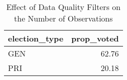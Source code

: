 \begin{table}[!htb]
\centering
\caption{Effect of Data Quality Filters on the Number of Observations} 
\label{table:pri_gen}
\begingroup\small
\begin{tabular}{lr}
  \hline
election_type & prop_voted \\ 
  \hline
GEN & 62.76 \\ 
  PRI & 20.18 \\ 
   \hline
\end{tabular}
\endgroup
\end{table}
